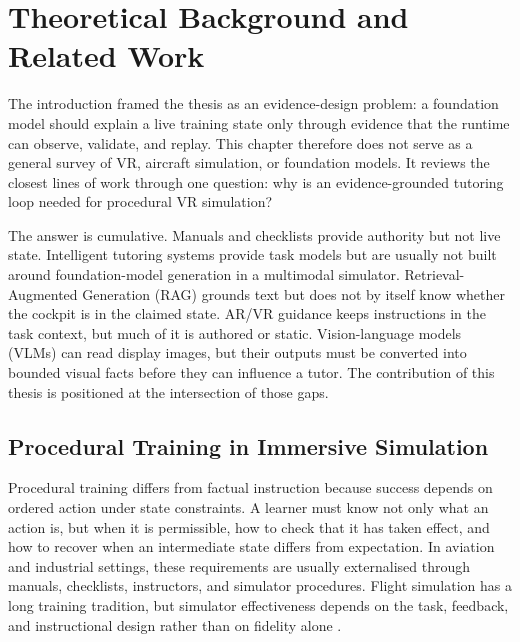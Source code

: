 %
\chapter{Theoretical Background and Related Work}\label{ch:background}

The introduction framed the thesis as an evidence-design problem: a foundation
model should explain a live training state only through evidence that the
runtime can observe, validate, and replay. This chapter therefore does not
serve as a general survey of VR, aircraft simulation, or foundation models.
It reviews the closest lines of work through one question: why is an
evidence-grounded tutoring loop needed for procedural VR simulation?

The answer is cumulative. Manuals and checklists provide authority but not
live state. Intelligent tutoring systems provide task models but are usually
not built around foundation-model generation in a multimodal simulator.
Retrieval-Augmented Generation (RAG) grounds text but does not by itself know
whether the cockpit is in the claimed state. AR/VR guidance keeps instructions
in the task context, but much of it is authored or static. Vision-language
models (VLMs) can read display images, but their outputs must be converted into
bounded visual facts before they can influence a tutor. The contribution of
this thesis is positioned at the intersection of those gaps.

\section{Procedural Training in Immersive Simulation}\label{sec:bg-procedural}

Procedural training differs from factual instruction because success depends on
ordered action under state constraints. A learner must know not only what an
action is, but when it is permissible, how to check that it has taken effect,
and how to recover when an intermediate state differs from expectation. In
aviation and industrial settings, these requirements are usually externalised
through manuals, checklists, instructors, and simulator procedures. Flight
simulation has a long training tradition, but simulator effectiveness depends
on the task, feedback, and instructional design rather than on fidelity alone
\citep{hays1992flight}.

